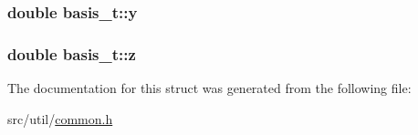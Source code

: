 \subsubsection[{y}]{\setlength{\rightskip}{0pt plus 5cm}double basis\+\_\+t\+::y}\label{structbasis__t_ad1faac3692f2d8ecc17a60f8ef94d433}
\hypertarget{structbasis__t_a63319e14c2c93f4663e9725c5608bfa6}{}
\subsubsection[{z}]{\setlength{\rightskip}{0pt plus 5cm}double basis\+\_\+t\+::z}\label{structbasis__t_a63319e14c2c93f4663e9725c5608bfa6}


The documentation for this struct was generated from the following file\+:\begin{DoxyCompactItemize}
\item 
src/util/\hyperlink{common_8h}{common.\+h}\end{DoxyCompactItemize}
